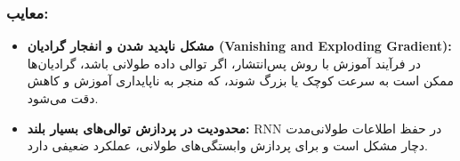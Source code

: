 \subsubsection{معایب:}


\begin{itemize}
	\item \textbf{مشکل ناپدید شدن و انفجار گرادیان (Vanishing and Exploding Gradient):} در فرآیند آموزش با روش پس‌انتشار، اگر توالی داده طولانی باشد، گرادیان‌ها ممکن است به سرعت کوچک یا بزرگ شوند، که منجر به ناپایداری آموزش و کاهش دقت می‌شود.
	
	\item \textbf{محدودیت در پردازش توالی‌های بسیار بلند:} RNN در حفظ اطلاعات طولانی‌مدت دچار مشکل است و برای پردازش وابستگی‌های طولانی، عملکرد ضعیفی دارد.
	
\end{itemize}





